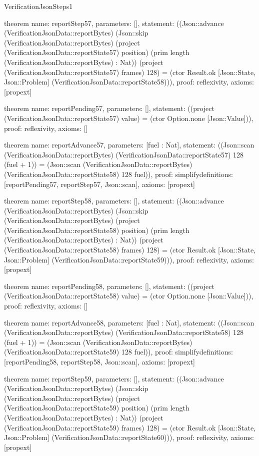 \begin{lexlean}{VerificationJsonSteps1}
\begin{semanticmodule}
theorem{
  name: reportStep57,
  parameters: [],
  statement: ((Json::advance (VerificationJsonData::reportBytes) (Json::skip (VerificationJsonData::reportBytes) (project (VerificationJsonData::reportState57) position) (prim length (VerificationJsonData::reportBytes) : Nat)) (project (VerificationJsonData::reportState57) frames) 128) = (ctor Result.ok [Json::State, Json::Problem] (VerificationJsonData::reportState58))),
  proof: reflexivity{},
  axioms: [propext]
}

theorem{
  name: reportPending57,
  parameters: [],
  statement: ((project (VerificationJsonData::reportState57) value) = (ctor Option.none [Json::Value])),
  proof: reflexivity{},
  axioms: []
}

theorem{
  name: reportAdvance57,
  parameters: [fuel : Nat],
  statement: ((Json::scan (VerificationJsonData::reportBytes) (VerificationJsonData::reportState57) 128 (fuel + 1)) = (Json::scan (VerificationJsonData::reportBytes) (VerificationJsonData::reportState58) 128 fuel)),
  proof: simplify{definitions: [reportPending57, reportStep57, Json::scan]},
  axioms: [propext]
}

theorem{
  name: reportStep58,
  parameters: [],
  statement: ((Json::advance (VerificationJsonData::reportBytes) (Json::skip (VerificationJsonData::reportBytes) (project (VerificationJsonData::reportState58) position) (prim length (VerificationJsonData::reportBytes) : Nat)) (project (VerificationJsonData::reportState58) frames) 128) = (ctor Result.ok [Json::State, Json::Problem] (VerificationJsonData::reportState59))),
  proof: reflexivity{},
  axioms: [propext]
}

theorem{
  name: reportPending58,
  parameters: [],
  statement: ((project (VerificationJsonData::reportState58) value) = (ctor Option.none [Json::Value])),
  proof: reflexivity{},
  axioms: []
}

theorem{
  name: reportAdvance58,
  parameters: [fuel : Nat],
  statement: ((Json::scan (VerificationJsonData::reportBytes) (VerificationJsonData::reportState58) 128 (fuel + 1)) = (Json::scan (VerificationJsonData::reportBytes) (VerificationJsonData::reportState59) 128 fuel)),
  proof: simplify{definitions: [reportPending58, reportStep58, Json::scan]},
  axioms: [propext]
}

theorem{
  name: reportStep59,
  parameters: [],
  statement: ((Json::advance (VerificationJsonData::reportBytes) (Json::skip (VerificationJsonData::reportBytes) (project (VerificationJsonData::reportState59) position) (prim length (VerificationJsonData::reportBytes) : Nat)) (project (VerificationJsonData::reportState59) frames) 128) = (ctor Result.ok [Json::State, Json::Problem] (VerificationJsonData::reportState60))),
  proof: reflexivity{},
  axioms: [propext]
}


\end{semanticmodule}
\end{lexlean}

